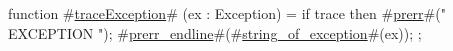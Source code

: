 function #\hyperref[sailMIPSztraceException]{traceException}# (ex : Exception) = {
  if trace then {
    #\hyperref[sailMIPSzprerr]{prerr}#(" EXCEPTION ");
    #\hyperref[sailMIPSzprerrzyendline]{prerr\_endline}#(#\hyperref[sailMIPSzstringzyofzyexception]{string\_of\_exception}#(ex));
  };
}
